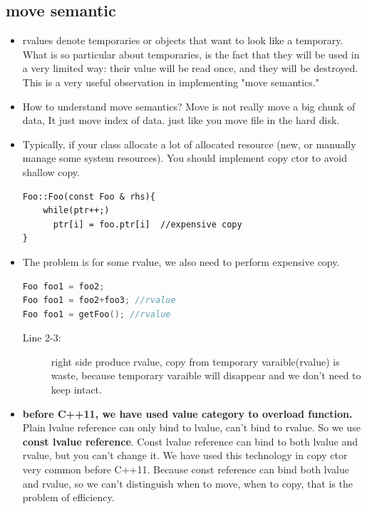 \documentclass[a4paper,11pt,twoside]{book}
\begin{document}
\subsection{ move semantic}
\begin{itemize}
	
	\item rvalues denote temporaries or objects that want to look like a temporary. What is so particular about temporaries, is the fact that they will be used in a very limited way: their value will be read once, and they will be destroyed. This is a very useful observation in implementing "move semantics." 
	
	\item How to understand move semantics? Move is not really move a big chunk of data, It just move index of data. just like you move file in the hard disk. 
	
	
	\item Typically, if your class allocate a lot of allocated resource (new, or manually manage some system resources).  You should implement copy ctor to avoid shallow copy. 
\begin{lstlisting}[numbers=none]
Foo::Foo(const Foo & rhs){
	while(ptr++;)
	  ptr[i] = foo.ptr[i]  //expensive copy
}
\end{lstlisting}

	\item The problem is for some rvalue, we also need to perform expensive copy. 
\begin{lstlisting}[frame=single, language=c++]
Foo foo1 = foo2;
Foo foo1 = foo2+foo3; //rvalue
Foo foo1 = getFoo(); //rvalue
\end{lstlisting}

\begin{description}
	\item[Line 2-3:] right side produce rvalue, copy from temporary varaible(rvalue) is waste, because temporary varaible will disappear and we don't need to keep intact. 
\end{description}

	\item \textbf{before C++11, we have used value category to overload function.} Plain lvalue reference can only bind to lvalue, can't bind to rvalue. So we use \textbf{const lvalue reference}.  Const lvalue reference can bind to both lvalue and rvalue, but you can't change it. We have used this technology in copy ctor very common before C++11. Because const reference can bind both lvalue and rvalue, so we can't distinguish when to move, when to copy, that is the problem of efficiency.


\end{itemize}
\end{document}
